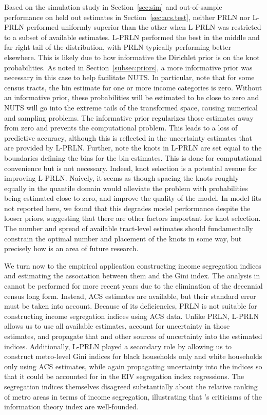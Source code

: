 \documentclass[12pt]{article}
\begin{document}
Based on the simulation study in Section~\ref{sec:sim} and out-of-sample performance on held out estimates in Section~\ref{sec:acs.test}, neither PRLN nor L-PRLN performed uniformly superior than the other when L-PRLN was restricted to a subset of available estimates. L-PRLN performed the best in the middle and far right tail of the distribution, with PRLN typically performing better elsewhere. This is likely due to how informative the Dirichlet prior is on the knot probabilities. As noted in Section~\ref{subsec:priors}, a more informative prior was necessary in this case to help facilitate NUTS.  In particular, note that for some census tracts, the bin estimate for one or more income categories is zero. Without an informative prior, these probabilities will be estimated to be close to zero and NUTS will go into the extreme tails of the transformed space, causing numerical and sampling problems. The informative prior regularizes those estimates away from zero and prevents the computational problem.  This leads to a loss of predictive accuracy, although this is reflected in the uncertainty estimates that are provided by L-PRLN.  Further, note the knots in L-PRLN are set equal to the boundaries defining the bins for the bin estimates.  This is done for computational convenience but is not necessary. Indeed, knot selection is a potential avenue for improving L-PRLN. Naively, it seems as though spacing the knots roughly equally in the quantile domain would alleviate the problem with probabilities being estimated close to zero, and improve the quality of the model. In model fits not reported here, we found that this degrades model performance despite the looser priors, suggesting that there are other factors important for knot selection. The number and spread of available tract-level estimates should fundamentally constrain the optimal number and placement of the knots in some way, but precisely how is an area of future research.

We turn now to the empirical application constructing income segregation indices and estimating the association between them and the Gini index. The analysis in \citet{reardon2011income} cannot be performed for more recent years due to the elimination of the decennial census long form. Instead, ACS estimates are available, but their standard error must be taken into account. Because of its deficiencies, PRLN is not suitable for constructing income segregation indices using ACS data. Unlike PRLN, L-PRLN allows us to use all available estimates, account for uncertainty in those estimates, and propagate that and other sources of uncertainty into the estimated indices. Additionally, L-PRLN played a secondary role by allowing us to construct metro-level Gini indices for black households only and white households only using ACS estimates, while again propagating uncertainty into the indices so that it could be accounted for in the EIV segregation index regressions. The segregation indices themselves disagreed substantially about the relative ranking of metro areas in terms of income segregation, illustrating that \citet{roberto2015divergence}'s criticisms of the information theory index are well-founded.
\end{document}
